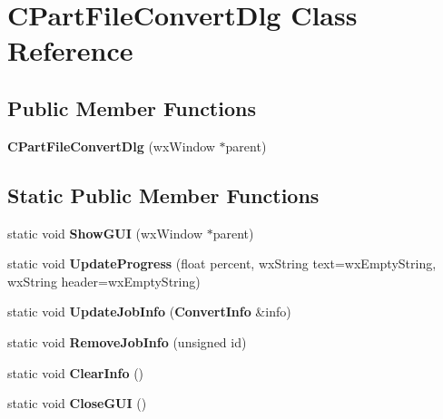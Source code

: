 \section{CPartFileConvertDlg Class Reference}
\label{classCPartFileConvertDlg}
\subsection*{Public Member Functions}
\begin{DoxyCompactItemize}
\item 
{\bfseries CPartFileConvertDlg} (wxWindow $\ast$parent)\label{classCPartFileConvertDlg_ae888b8fe2a0aec9a591ee468a25709a2}

\end{DoxyCompactItemize}
\subsection*{Static Public Member Functions}
\begin{DoxyCompactItemize}
\item 
static void {\bfseries ShowGUI} (wxWindow $\ast$parent)\label{classCPartFileConvertDlg_a7b6deacba844b755328d0f395f650de6}

\item 
static void {\bfseries UpdateProgress} (float percent, wxString text=wxEmptyString, wxString header=wxEmptyString)\label{classCPartFileConvertDlg_a3201ea34628d500f98613d79987b90b1}

\item 
static void {\bfseries UpdateJobInfo} ({\bf ConvertInfo} \&info)\label{classCPartFileConvertDlg_afc8188a32de176462ff43116253dfccb}

\item 
static void {\bfseries RemoveJobInfo} (unsigned id)\label{classCPartFileConvertDlg_afbb5100e7668aa959e69f179a2412c66}

\item 
static void {\bfseries ClearInfo} ()\label{classCPartFileConvertDlg_a506141ffffe0d7fadd8db1ca9d537b44}

\item 
static void {\bfseries CloseGUI} ()\label{classCPartFileConvertDlg_ac7c4fba6162863b7b88a530ac38cd441}

\end{DoxyCompactItemize}
